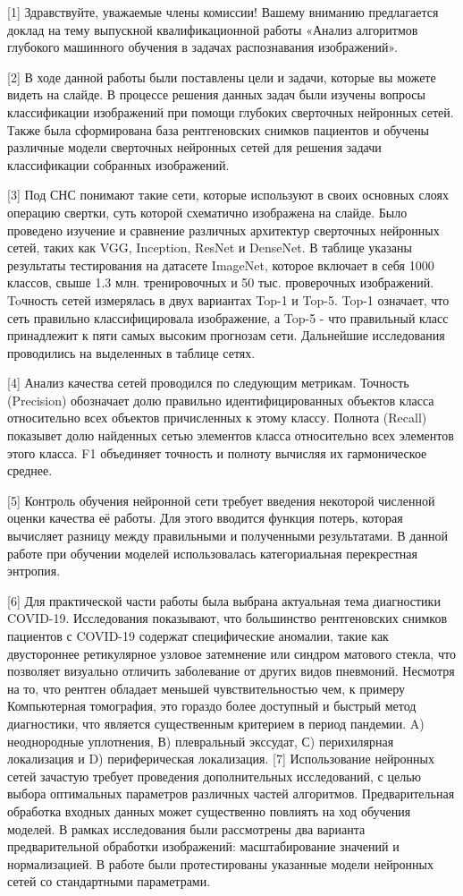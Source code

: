 [1]
Здравствуйте, уважаемые члены комиссии!
Вашему вниманию предлагается доклад на тему выпускной квалификационной работы «Анализ алгоритмов глубокого машинного обучения  в задачах распознавания изображений».

[2]
В ходе данной работы были поставлены цели и задачи, которые вы можете видеть на слайде. В процессе решения данных задач были изучены вопросы классификации изображений при помощи глубоких сверточных нейронных сетей. Также была сформирована база рентгеновских снимков пациентов и обучены различные модели сверточных нейронных сетей для решения задачи классификации собранных изображений.

[3]
Под СНС понимают такие сети, которые используют в своих основных слоях операцию свертки, суть которой схематично изображена на слайде. Было проведено изучение и сравнение различных архитектур сверточных нейронных сетей, таких как VGG, Inception, ResNet и DenseNet. В таблице указаны результаты тестирования на датасете ImageNet, которое включает в себя 1000 классов, свыше 1.3 млн. тренировочных и 50 тыс. проверочных изображений. Toчность сетей измерялась в двух вариантах Top-1 и Top-5. Top-1 означает, что сеть правильно классифицировала изображение, а Top-5 - что правильный класс принадлежит к пяти самых высоким прогнозам сети. Дальнейшие исследования проводились на выделенных в таблице сетях.

[4]
Анализ качества сетей проводился по следующим метрикам.
Точность (Precision) обозначает долю правильно идентифицированных объектов класса относительно всех объектов причисленных к этому классу. Полнота (Recall) показывет долю найденных сетью элементов класса относительно всех элементов этого класса.
F1 объединяет точность и полноту вычисляя их гармоническое среднее.

[5]
Контроль обучения нейронной сети требует введения некоторой численной оценки качества её работы. Для этого вводится функция потерь, которая вычисляет разницу между правильными и полученными результатами. В данной работе при обучении моделей использовалась категориальная перекрестная энтропия.

[6]
Для практической части работы была выбрана актуальная тема диагностики COVID-19.
Исследования показывают, что большинство рентгеновских снимков пациентов с COVID-19 содержат специфические аномалии, такие как двустороннее ретикулярное узловое затемнение или синдром матового стекла, что позволяет визуально отличить заболевание от других видов пневмоний. Несмотря на то, что рентген обладает меньшей чувствительностью чем, к примеру Компьютерная томография, это гораздо более доступный и быстрый метод диагностики, что является существенным критерием в период пандемии.
A) неоднородные уплотнения, В) плевральный экссудат, С) перихилярная локализация и D) периферическая локализация.
[7]
Использование нейронных сетей зачастую требует проведения дополнительных исследований, с целью выбора оптимальных параметров различных частей алгоритмов. Предварительная обработка входных данных может существенно повлиять на ход обучения моделей. В рамках исследования были рассмотрены два варианта предварительной обработки изображений: масштабирование значений и нормализацией.
В работе были протестированы указанные модели нейронных сетей со стандартными параметрами. 

